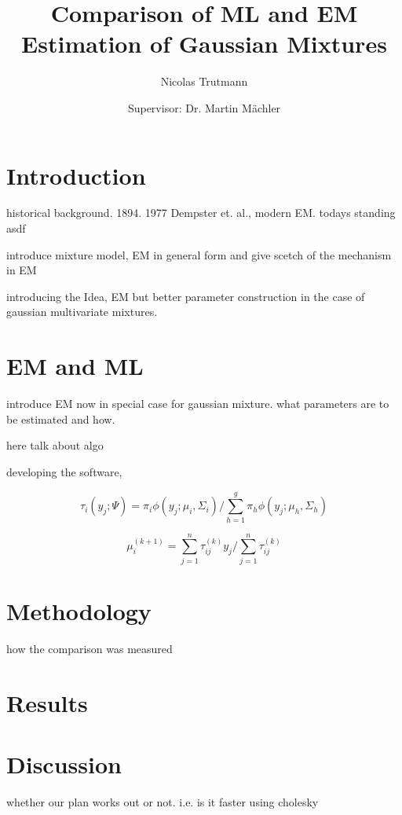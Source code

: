 


\title{Comparison of ML and EM Estimation of Gaussian Mixtures}
\author{Nicolas Trutmann \and Supervisor: Dr. Martin Mächler}




\maketitle

\tableofcontents

\section{Introduction}

historical background. 1894. 1977 Dempster et. al., modern EM. todays standing
asdf \cite{McLGP00}

introduce mixture model, EM in general form and give scetch of the mechanism in EM

introducing the Idea, EM but better parameter construction in the case of gaussian multivariate mixtures.

\section{EM and ML}

introduce EM now in special case for gaussian mixture. what parameters are to be estimated and how.

here talk about algo

developing the software,


\[ \tau_{i}(y_j; \Psi) = \pi_i \phi(y_j; \mu_i, \Sigma_i) / \sum_{h=1}^g \pi_h \phi(y_j;\mu_h, \Sigma_h) \]

\[ \mu_i^{(k+1)} = \sum_{j=1}^n \tau_{ij}^{(k)} y_j /\sum_{j=1}^n \tau_{ij}^{(k)} \]

\section{Methodology}

how the comparison was measured

\section{Results}

\section{Discussion}

whether our plan works out or not. i.e. is it faster using cholesky






